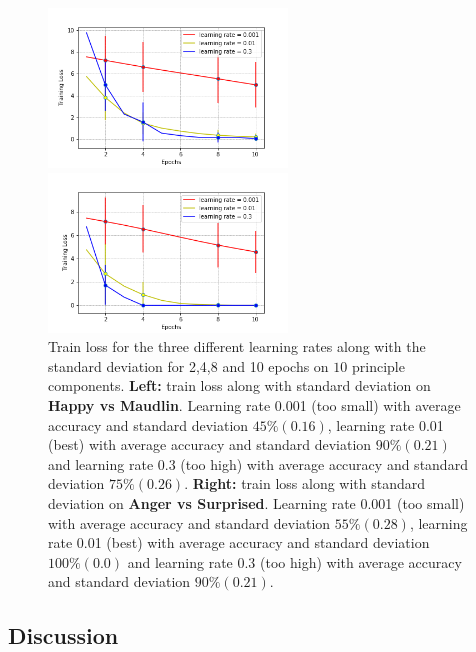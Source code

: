 \documentclass{article}
\begin{document}
\begin{figure}
\begin{center}
\begin{minipage}[t]{0.4\linewidth}
  \centering
  \includegraphics[width=2.5in]{images/hm_loss_lr.png}
\end{minipage}
\begin{minipage}[t]{0.5\linewidth}
  \centering
  \includegraphics[width=2.5in]{images/as_loss_lr.png}
\end{minipage}
\caption{Train loss for the three different learning rates along with the standard deviation for 2,4,8 and 10 epochs on $10$ principle components. \textbf{Left:} train loss along with standard deviation on \textbf{Happy vs Maudlin}. Learning rate 0.001 (too small) with average accuracy and standard deviation $45\%(0.16)$, learning rate 0.01 (best) with average accuracy and standard deviation $90\%(0.21)$ and learning rate 0.3 (too high) with average accuracy and standard deviation $75\%(0.26)$. \textbf{Right:} train loss along with standard deviation on \textbf{Anger vs Surprised}. Learning rate 0.001 (too small) with average accuracy and standard deviation $55\%(0.28)$, learning rate 0.01 (best) with average accuracy and standard deviation $100\%(0.0)$ and learning rate 0.3 (too high) with average accuracy and standard deviation $90\%(0.21)$.}
\end{center}
\end{figure}

\subsection{Discussion}
\end{document}
